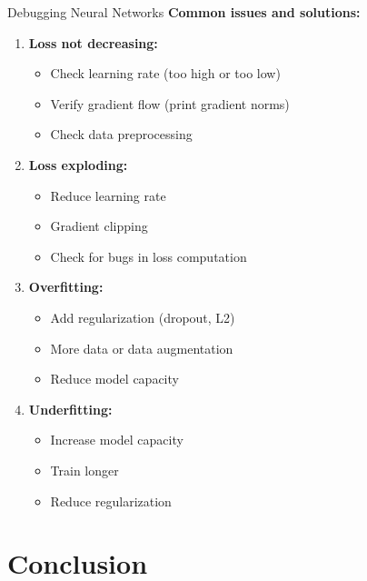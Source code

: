 \documentclass[aspectratio=169]{beamer}
\begin{document}
\begin{frame}{Debugging Neural Networks}
  \textbf{Common issues and solutions:}

  \vspace{0.5em}

  \begin{enumerate}
    \item \textbf{Loss not decreasing:}
    \begin{itemize}
      \item Check learning rate (too high or too low)
      \item Verify gradient flow (print gradient norms)
      \item Check data preprocessing
    \end{itemize}

    \item \textbf{Loss exploding:}
    \begin{itemize}
      \item Reduce learning rate
      \item Gradient clipping
      \item Check for bugs in loss computation
    \end{itemize}

    \item \textbf{Overfitting:}
    \begin{itemize}
      \item Add regularization (dropout, L2)
      \item More data or data augmentation
      \item Reduce model capacity
    \end{itemize}

    \item \textbf{Underfitting:}
    \begin{itemize}
      \item Increase model capacity
      \item Train longer
      \item Reduce regularization
    \end{itemize}
  \end{enumerate}
\end{frame}

\section{Conclusion}
\end{document}
